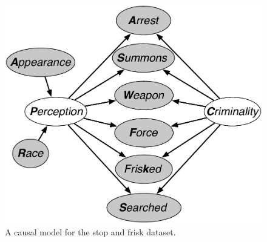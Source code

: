 \begin{figure}[th]
\begin{center}
\vspace{-1ex}
\centerline{\includegraphics[width=\columnwidth]{stop_and_frisk_model3.pdf}}
\vspace{-2ex}
\caption{A causal model for the stop and frisk dataset.\label{figure.stop_and_frisk}\vspace{-4ex}}
\vspace{-2ex}
\end{center}
\end{figure}


